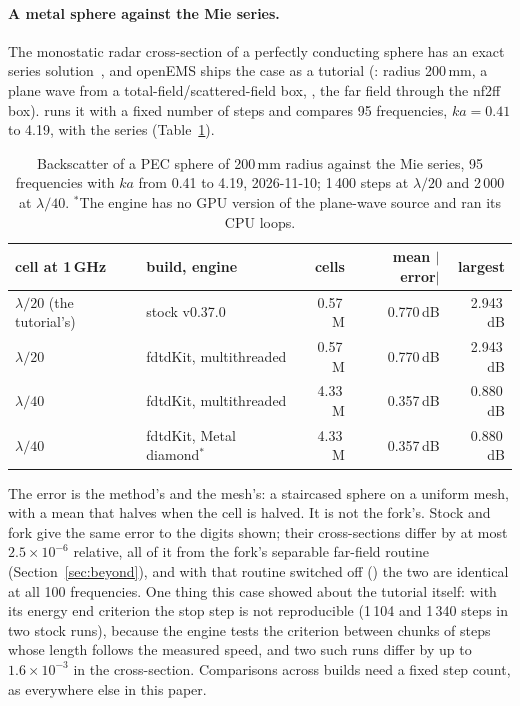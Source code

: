 \paragraph{A metal sphere against the Mie series.}
The monostatic radar cross-section of a perfectly conducting sphere has an exact series
solution~\cite{mie}, and openEMS ships the case as a tutorial (: radius 200\,mm, a plane wave from
a total-field/scattered-field box, , the far field through the nf2ff box).
 runs it with a fixed number of steps and compares 95 frequencies, $ka=0.41$ to
4.19, with the series (Table~\ref{tab:mie}).

\begin{table}[H]\centering\small
\begin{tabular}{@{}llrrr@{}}
\toprule
cell at 1\,GHz & build, engine & cells & mean $|$error$|$ & largest \\
\midrule
$\lambda/20$ (the tutorial's) & stock v0.37.0 & 0.57\,M & 0.770\,dB & 2.943\,dB \\
$\lambda/20$ & fdtdKit, multithreaded & 0.57\,M & 0.770\,dB & 2.943\,dB \\
$\lambda/40$ & fdtdKit, multithreaded & 4.33\,M & 0.357\,dB & 0.880\,dB \\
$\lambda/40$ & fdtdKit, Metal diamond$^{*}$ & 4.33\,M & 0.357\,dB & 0.880\,dB \\
\bottomrule
\end{tabular}
\caption{Backscatter of a PEC sphere of 200\,mm radius against the Mie series, 95 frequencies with $ka$ from 0.41
to 4.19, 2026-11-10; 1\,400 steps at $\lambda/20$ and 2\,000 at $\lambda/40$. $^{*}$The engine has no GPU version of
the plane-wave source and ran its CPU loops.}\label{tab:mie}
\end{table}

The error is the method's and the mesh's: a staircased sphere on a uniform mesh, with a mean that halves when the cell is halved.
It is not the fork's. Stock and fork give the same error to the digits shown; their cross-sections differ by at most
$2.5\times10^{-6}$ relative, all of it from the fork's separable far-field routine
(Section~\ref{sec:beyond}), and with that routine switched off () the two are identical
at all 100 frequencies. One thing this case showed about the tutorial itself: with its energy end criterion the stop
step is not reproducible (1\,104 and 1\,340 steps in two stock runs), because the engine tests the criterion between
chunks of steps whose length follows the measured speed, and two such runs differ by up to $1.6\times10^{-3}$ in
the cross-section. Comparisons across builds need a fixed step count, as everywhere else in this paper.
